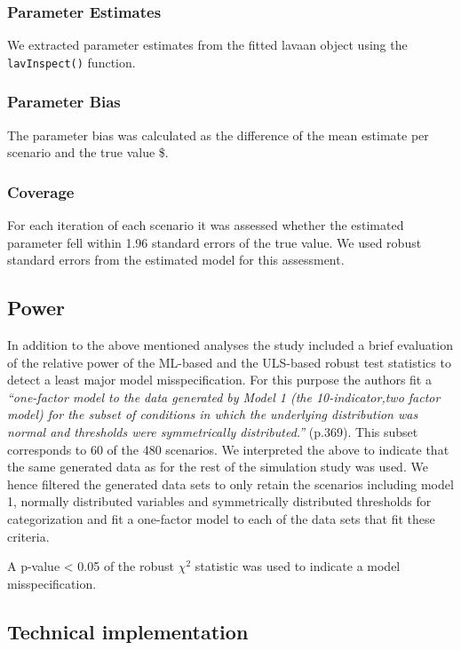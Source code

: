 \documentclass[10,a4paperpaper,]{article}
\begin{document}
\subsubsection{Parameter Estimates}

We extracted parameter estimates from the fitted lavaan object using the
\texttt{lavInspect()} function.

\subsubsection{Parameter Bias}

The parameter bias was calculated as the difference of the mean estimate
per scenario and the true value \$.

\subsubsection{Coverage}

For each iteration of each scenario it was assessed whether the
estimated parameter fell within 1.96 standard errors of the true value.
We used robust standard errors from the estimated model for this
assessment.

\subsection{Power}

In addition to the above mentioned analyses the study included a brief
evaluation of the relative power of the ML-based and the ULS-based
robust test statistics to detect a least major model misspecification.
For this purpose the authors fit a \emph{``one-factor model to the data
generated by Model 1 (the 10-indicator,two factor model) for the subset
of conditions in which the underlying distribution was normal and
thresholds were symmetrically distributed.''} (p.369). This subset
corresponds to 60 of the 480 scenarios. We interpreted the above to
indicate that the same generated data as for the rest of the simulation
study was used. We hence filtered the generated data sets to only retain
the scenarios including model 1, normally distributed variables and
symmetrically distributed thresholds for categorization and fit a
one-factor model to each of the data sets that fit these criteria.

A p-value \textless{} 0.05 of the robust \(\chi^2\) statistic was used
to indicate a model misspecification.

\subsection{Technical implementation}
\end{document}

